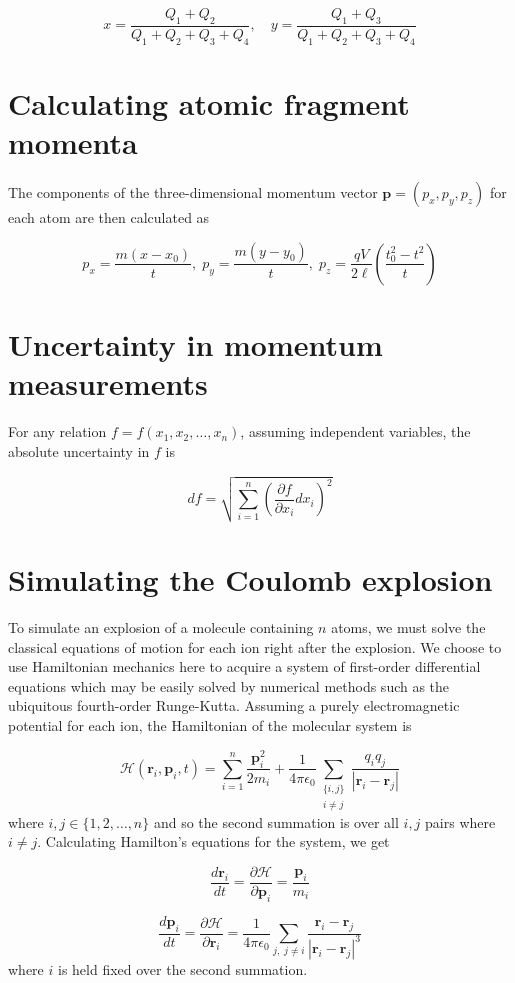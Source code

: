 \begin{equation}
x = \frac{Q_1 + Q_2}{Q_1 + Q_2 + Q_3 + Q_4} ,\quad
y = \frac{Q_1 + Q_3}{Q_1 + Q_2 + Q_3 + Q_4}
\end{equation}


\section{Calculating atomic fragment momenta}
The components of the three-dimensional momentum vector $\mathbf{p} = (p_x,p_y,p_z)$ for each atom are then calculated as

\begin{equation}
p_x = \frac{m(x-x_0)}{t} ,\;
p_y = \frac{m(y-y_0)}{t} ,\;
p_z = \frac{qV}{2\ell} \left( \frac{t_0^2 - t^2}{t} \right)
\end{equation}

\section{Uncertainty in momentum measurements}
For any relation $f = f(x_1, x_2, \dots, x_n)$, assuming independent variables, the absolute uncertainty in $f$ is

\begin{equation}
df = \sqrt{\sum_{i=1}^{n} \left( \frac{\partial f}{\partial x_i} dx_i \right)^2}
\end{equation}

\section{Simulating the Coulomb explosion}
To simulate an explosion of a molecule containing $n$ atoms, we must solve the classical equations of motion for each ion right after the explosion. We choose to use Hamiltonian mechanics here to acquire a system of first-order differential equations which may be easily solved by numerical methods such as the ubiquitous fourth-order Runge-Kutta. Assuming a purely electromagnetic potential for each ion, the Hamiltonian of the molecular system is

$$ \mathcal{H}(\mathbf{r}_i, \mathbf{p}_i, t) = \sum_{i=1}^n \frac{\mathbf{p}_i^2}{2m_i} + \frac{1}{4\pi\epsilon_0}\sum_{\substack{\lbrace i,j\rbrace\\ i \ne j}} \frac{q_iq_j}{|\mathbf{r}_i-\mathbf{r}_j|}$$
where $i,j \in \lbrace 1,2,\dots, n \rbrace$ and so the second summation is over all $i,j$ pairs where $i \ne j$. Calculating Hamilton's equations for the system, we get

$$ \frac{d\mathbf{r}_i}{dt} = \frac{\partial \mathcal{H}}{\partial \mathbf{p}_i} = \frac{\mathbf{p}_i}{m_i} $$

$$ \frac{d\mathbf{p}_i}{dt} = \frac{\partial \mathcal{H}}{\partial \mathbf{r}_i} = \frac{1}{4\pi\epsilon_0}\sum_{j, \; j \ne i} \frac{\mathbf{r}_i - \mathbf{r}_j}{|\mathbf{r}_i - \mathbf{r}_j|^3} $$
where $i$ is held fixed over the second summation.
